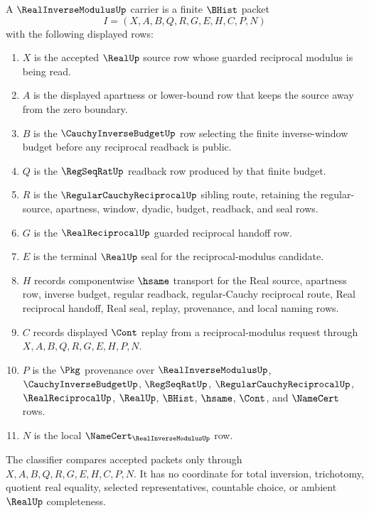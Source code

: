 \begin{definition}
\label{def:real-inverse-modulus-carrier}
A $\RealInverseModulusUp$ carrier is a finite $\BHist$ packet
$$
I=(X,A,B,Q,R,G,E,H,C,P,N)
$$
with the following displayed rows:
\begin{enumerate}
\item $X$ is the accepted $\RealUp$ source row whose guarded reciprocal modulus is being read.
\item $A$ is the displayed apartness or lower-bound row that keeps the source away from the zero boundary.
\item $B$ is the $\CauchyInverseBudgetUp$ row selecting the finite inverse-window budget before any reciprocal readback is public.
\item $Q$ is the $\RegSeqRatUp$ readback row produced by that finite budget.
\item $R$ is the $\RegularCauchyReciprocalUp$ sibling route, retaining the regular-source, apartness, window, dyadic, budget, readback, and seal rows.
\item $G$ is the $\RealReciprocalUp$ guarded reciprocal handoff row.
\item $E$ is the terminal $\RealUp$ seal for the reciprocal-modulus candidate.
\item $H$ records componentwise $\hsame$ transport for the Real source, apartness row, inverse budget, regular readback, regular-Cauchy reciprocal route, Real reciprocal handoff, Real seal, replay, provenance, and local naming rows.
\item $C$ records displayed $\Cont$ replay from a reciprocal-modulus request through $X,A,B,Q,R,G,E,H,P,N$.
\item $P$ is the $\Pkg$ provenance over $\RealInverseModulusUp$, $\CauchyInverseBudgetUp$, $\RegSeqRatUp$, $\RegularCauchyReciprocalUp$, $\RealReciprocalUp$, $\RealUp$, $\BHist$, $\hsame$, $\Cont$, and $\NameCert$ rows.
\item $N$ is the local $\NameCert_{\RealInverseModulusUp}$ row.
\end{enumerate}
The classifier compares accepted packets only through $X,A,B,Q,R,G,E,H,C,P,N$. It has no coordinate for total inversion, trichotomy, quotient real equality, selected representatives, countable choice, or ambient $\RealUp$ completeness.
\end{definition}

